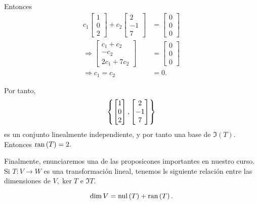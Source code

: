 \begin{solucion}
Entonces \begin{align*}
          c_{1}\begin{bmatrix}
     1 \\ 0 \\ 2
    \end{bmatrix}+c_{2} \begin{bmatrix}
         2 \\ -1 \\ 7
        \end{bmatrix}&=
        \begin{bmatrix}
         0 \\ 0\\ 0
        \end{bmatrix}\\
        \Rightarrow
        \begin{bmatrix}
         c_{1}+c_{2} \\ -c_{2} \\ 2c_{1}+7c_{2}
        \end{bmatrix}&=
        \begin{bmatrix}
         0 \\ 0\\ 0
        \end{bmatrix}\\
\Rightarrow c_{1}=c_{2}&=0.
         \end{align*}
         
Por tanto, $$\left\{ \begin{bmatrix}
     1 \\ 0 \\ 2
    \end{bmatrix}, \begin{bmatrix}
         2 \\ -1 \\ 7
        \end{bmatrix} \right\}$$  es un conjunto linealmente independiente,  y por tanto una base de $\Im(T).$ Entonces
$\operatorname{ran}\left( T \right)=2.$  

\end{solucion}

Finalmente, enunciaremos una de las proposicones importantes en nuestro curso. Si $T:V\to W$ es una transformaci\'on
lineal, tenemos ls siguiente relaci\'on entre las dimensiones de $V, \ker{T}$ e $\Im{T}.$
\begin{proposicion}
\label{thm:dim}
$$\dim{V}=\operatorname{nul}\left( T \right)+\operatorname{ran}\left( T \right).$$
\end{proposicion}

